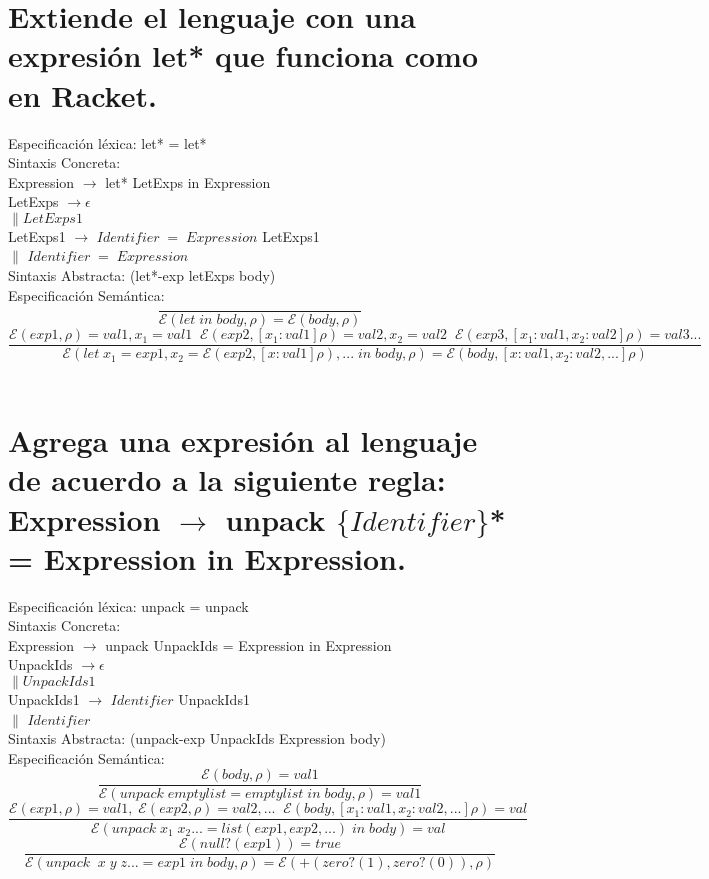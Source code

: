 \documentclass{article}
\begin{document}
\section{Extiende el lenguaje con una expresión let* que funciona como en Racket.}
Especificación léxica: let* = let*
\\
Sintaxis Concreta:
\\
Expression $\rightarrow$ let* LetExps in Expression 
\\
LetExps $\rightarrow \epsilon$
\\
$\|LetExps1$
\\
LetExps1 $\rightarrow$ $Identifier\; = \;Expression$ LetExps1
\\
$\|$ $Identifier\; = \;Expression$ 
\\
Sintaxis Abstracta:
(let*-exp letExps body)
\\
Especificación Semántica:
$$\frac{}{\mathcal{E} (let\; in\; body, \rho ) = \mathcal{E} (body,\rho)}$$
$$\frac{\mathcal{E} (exp1, \rho) = val1, x_1=val1 \;\; \mathcal{E} (exp2,[x_1:val1] \rho) = val2, x_2=val2 \;\; \mathcal{E} (exp3,[x_1:val1, x_2:val2] \rho) = val3...}{\mathcal{E} (let\; x_1 = exp1, x_2 = \mathcal{E}(exp2,[x:val1] \rho), ...\; in\; body, \rho ) = \mathcal{E} (body,[x : val1, x_2 : val2, ...]\rho)}$$
\\

\section{Agrega una expresión al lenguaje de acuerdo a la siguiente regla: Expression $\rightarrow$ unpack $\{Identifier\}$* = Expression in Expression.}
Especificación léxica: unpack = unpack
\\
Sintaxis Concreta:
\\
Expression $\rightarrow$ unpack UnpackIds = Expression in Expression 
\\
UnpackIds $\rightarrow \epsilon$
\\
$\|UnpackIds1$
\\
UnpackIds1 $\rightarrow$ $Identifier$ UnpackIds1
\\
$\|$ $Identifier$ 
\\
Sintaxis Abstracta:
(unpack-exp UnpackIds Expression body)
\\
Especificación Semántica:
$$\frac{\mathcal{E} (body, \rho ) = val1}{\mathcal{E} (unpack\; emptylist = emptylist\;in \;body, \rho ) = val1}$$
$$\frac{\mathcal{E} (exp1, \rho) = val1,\;\mathcal{E} (exp2, \rho) = val2,...\;\; \mathcal{E} (body,[x_1:val1,x_2:val2,...] \rho) = val}{\mathcal{E}(unpack\; x_1\; x_2 ... = list(exp1,exp2,...) \;in\; body)= val}$$
$$\frac{\mathcal{E}(null?(exp1)) = true}{\mathcal{E} (unpack\; \; x \; y \; z... = exp1 \;in \;body, \rho ) = \mathcal{E}(+(zero?(1), zero?(0)),\rho)}$$
\end{document}
